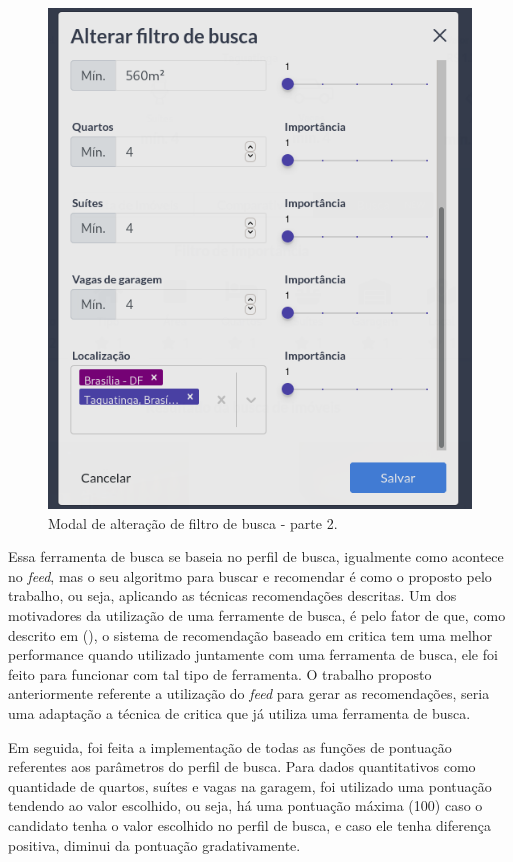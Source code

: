 \begin{figure}[H]
    \centering
    \includegraphics[scale=0.45]{figuras/desenvolvimento/componente_filtro4.png}
    \caption[Modal de alteração de filtro de busca - parte 2]{Modal de alteração de filtro de busca - parte 2.}
    \label{fig:componente_filtro4}
\end{figure}

Essa ferramenta de busca se baseia no perfil de busca, igualmente como acontece no \textit{feed}, mas o seu algoritmo para buscar e recomendar é como o proposto pelo trabalho, ou seja, aplicando as técnicas recomendações descritas. Um dos motivadores da utilização de uma ferramente de busca, é pelo fator de que, como descrito em (), o sistema de recomendação baseado em critica tem uma melhor performance quando utilizado juntamente com uma ferramenta de busca, ele foi feito para funcionar com tal tipo de ferramenta. O trabalho proposto anteriormente referente a utilização do \textit{feed} para gerar as recomendações, seria uma adaptação a técnica de critica que já utiliza uma ferramenta de busca.

Em seguida, foi feita a implementação de todas as funções de pontuação referentes aos parâmetros do perfil de busca. Para dados quantitativos como quantidade de quartos, suítes e vagas na garagem, foi utilizado uma pontuação tendendo ao valor escolhido, ou seja, há uma pontuação máxima (100) caso o candidato tenha o valor escolhido no perfil de busca, e caso ele tenha diferença positiva, diminui da pontuação gradativamente.

